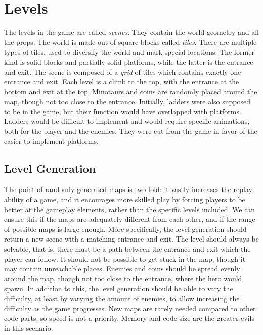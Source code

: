 \section{Levels} %
The levels in the game are called \emph{scenes}. They contain the world geometry and all the props. The world is made out of square blocks called \emph{tiles}. There are multiple types of tiles, used to diversify the world and mark special locations. The former kind is solid blocks and partially solid platforms, while the latter is the entrance and exit. The scene is composed of a \emph{grid} of tiles which contains exactly one entrance and exit. Each level is a climb to the top, with the entrance at the bottom and exit at the top. Minotaurs and coins are randomly placed around the map, though not too close to the entrance.
\newline
Initially, ladders were also supposed to be in the game, but their function would have overlapped with platforms. Ladders would be difficult to implement and would require specific animations, both for the player and the enemies. They were cut from the game in favor of the easier to implement platforms.

\subsection{Level Generation} %
The point of randomly generated maps is two fold: it vastly increases the replay-ability of a game, and it encourages more skilled play by forcing players to be better at the gameplay elements, rather than the specific levels included. We can ensure this if the maps are adequately different from each other, and if the range of possible maps is large enough. %
\newline
More specifically, the level generation should return a new scene with a matching entrance and exit. The level should always be solvable, that is, there must be a path between the entrance and exit which the player can follow. It should not be possible to get stuck in the map, though it may contain unreachable places. Enemies and coins should be spread evenly around the map, though not too close to the entrance, where the hero would spawn. In addition to this, the level generation should be able to vary the difficulty, at least by varying the amount of enemies, to allow increasing the difficulty as the game progresses. %
\newline
New maps are rarely needed compared to other code parts, so speed is not a priority. Memory and code size are the greater evils in this scenario.

